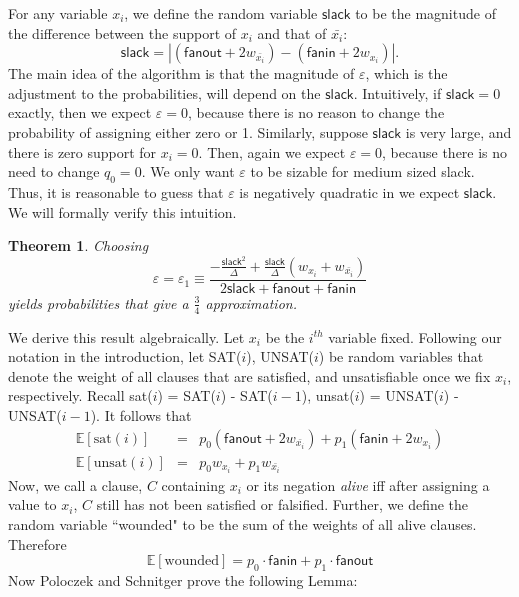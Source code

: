 \documentclass[11pt,letter]{article}
\newtheorem{theorem}{Theorem}
\numberwithin{theorem}{section}
\begin{document}
For any variable $x_i$, we define the random variable $\mathsf{slack}$ to be the magnitude of the difference between the support of $x_i$ and that of $\bar{x_i}$:
\begin{equation}
\mathsf{slack} = |(\mathsf{fanout} + 2w_{\bar{x_i}}) -(\mathsf{fanin} + 2w_{x_i})|.
\end{equation}
The main idea of the algorithm is that the magnitude of $\varepsilon$, which is the adjustment to the probabilities, will depend on the $\mathsf{slack}$. Intuitively, if $\mathsf{slack} = 0$ exactly, then we expect $\varepsilon = 0$, because there is no reason to change the probability of assigning either zero or 1. Similarly, suppose $\mathsf{slack}$ is very large, and there is zero support for $x_i = 0$. Then, again we expect $\varepsilon = 0$, because there is no need to change $q_0 = 0$. We only want $\varepsilon$ to be sizable for medium sized slack. Thus, it is reasonable to guess that $\varepsilon$ is negatively quadratic in we expect $\mathsf{slack}$. We will formally verify this intuition.
\begin{theorem}
Choosing $$\varepsilon = \varepsilon_1 \equiv \frac{-\frac{\mathsf{slack}^2}{\Delta} + \frac{\mathsf{slack}}{\Delta}(w_{x_i} + w_{\bar{x_i}})}{2\mathsf{slack}+ \mathsf{fanout} + \mathsf{fanin}}$$ yields probabilities that give a $\frac{3}{4}$ approximation.
\end{theorem}
We derive this result algebraically. Let $x_i$ be the $i^{th}$ variable fixed. Following our notation in the introduction, let SAT($i$), UNSAT($i$) be random variables that denote the weight of all clauses that are satisfied, and unsatisfiable once we fix $x_i$, respectively. Recall sat($i$) = SAT($i$) - SAT($i-1$), unsat($i$) = UNSAT($i$) - UNSAT($i-1$). It follows that
\begin{eqnarray}
\mathbb{E}[\textrm{sat}(i)] &=& p_0(\mathsf{fanout} + 2w_{\bar{x_i}}) + p_1(\mathsf{fanin} + 2w_{x_i})\\
\mathbb{E}[\textrm{unsat}(i)] &=& p_0w_{x_i} + p_1w_{\bar{x_i}}
\end{eqnarray}
Now, we call a clause, $C$ containing $x_i$ or its negation \textit{alive} iff after assigning a value to $x_i$, $C$ still has not been satisfied or falsified. Further, we define the random variable ``wounded" to be the sum of the weights of all alive clauses. Therefore
\begin{equation}
\mathbb{E}[\textrm{wounded}] = p_0 \cdot \mathsf{fanin} + p_1 \cdot \mathsf{fanout}
\end{equation}
Now Poloczek and Schnitger prove the following Lemma:
\end{document}
